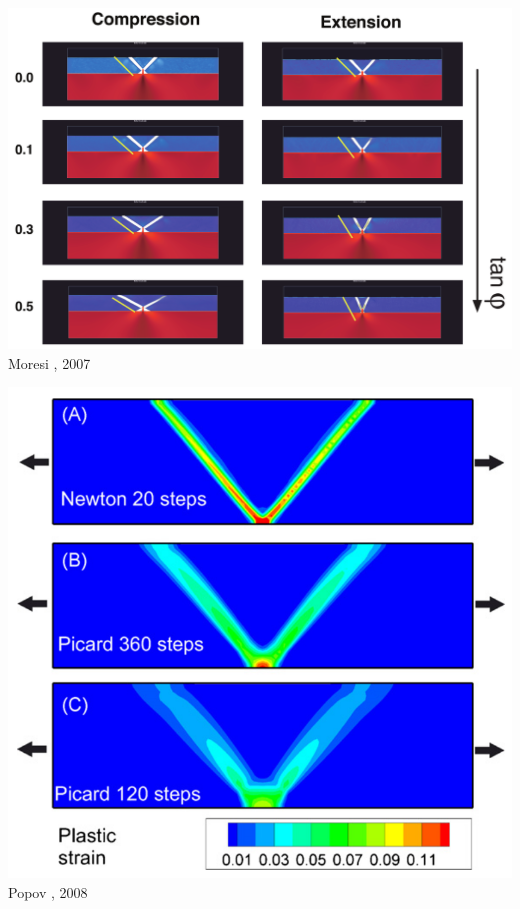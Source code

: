 \begin{center}
\begin{minipage}{0.45\textwidth}
\centering
\includegraphics[height=0.8\textwidth]{images/benchmark_brick/moml07}\\
{\captionfont Moresi \etal, 2007 \cite{moml07}}
\end{minipage}\hfill
\begin{minipage}{0.45\textwidth}
\centering
\includegraphics[height=0.8\textwidth]{images/benchmark_brick/poso08}\\
{\captionfont Popov \etal, 2008 \cite{poso08}}
\end{minipage}
\end{center}

